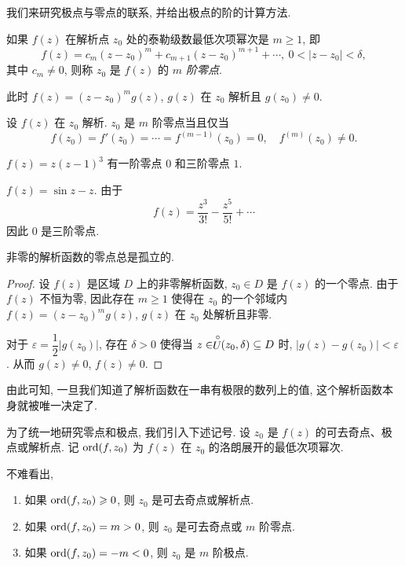 我们来研究极点与零点的联系, 并给出极点的阶的计算方法.
\begin{definition}\label{def:zero-order}
	如果 $f(z)$ 在解析点 $z_0$ 处的泰勒级数最低次项幂次是 $m\ge1$, 即
	\[f(z)=c_m(z-z_0)^m+c_{m+1}(z-z_0)^{m+1}+\cdots,\ 0<|z-z_0|<\delta,\]
	其中 $c_m\neq 0$, 则称 $z_0$ 是 $f(z)$ 的 \emph{$m$ 阶零点}.
\end{definition}

此时 $f(z)=(z-z_0)^mg(z)$, $g(z)$ 在 $z_0$ 解析且 $g(z_0)\neq 0$.

\begin{theorem}
	设 $f(z)$ 在 $z_0$ 解析.
	$z_0$ 是 $m$ 阶零点当且仅当
	\[f(z_0)=f'(z_0)=\cdots=f^{(m-1)}(z_0)=0,\quad
	f^{(m)}(z_0)\neq 0.\]
\end{theorem}

\begin{example}
		$f(z)=z(z-1)^3$
	{有一阶零点 $0$ 和三阶零点 $1$.
	}
\end{example}

\begin{example}
		$f(z)=\sin z-z$.
	{由于
		\[f(z)=\frac{z^3}{3!}-\frac{z^5}{5!}+\cdots\]
		因此 $0$ 是三阶零点.
	}
\end{example}

\begin{theorem}\label{thm:zero-isolated}
非零的解析函数的零点总是孤立的.
\end{theorem}

\begin{proof}
	设 $f(z)$ 是区域 $D$ 上的非零解析函数, $z_0\in D$ 是 $f(z)$ 的一个零点.
	由于 $f(z)$ 不恒为零, 因此存在 $m\ge 1$ 使得在 $z_0$ 的一个邻域内 $f(z)=(z-z_0)^m g(z)$, $g(z)$ 在 $z_0$ 处解析且非零.
	
	对于 $\varepsilon=\dfrac12|g(z_0)|$, 存在 $\delta>0$ 使得当 $z\in \stackrel{\circ}{U}\!\!(z_0,\delta)\subseteq D$ 时, $|g(z)-g(z_0)|<\varepsilon$.
	从而 $g(z)\neq0$, $f(z)\neq 0$.
\end{proof}

由此可知, 一旦我们知道了解析函数在一串有极限的数列上的值, 这个解析函数本身就被唯一决定了.

为了统一地研究零点和极点, 我们引入下述记号.
设 $z_0$ 是 $f(z)$ 的可去奇点、极点或解析点.
记 ${\mathrm{ord}}(f,z_0)$ 为 $f(z)$ 在 $z_0$ 的洛朗展开的最低次项幂次.

不难看出,
\begin{enumerate}
	\item 如果 ${\mathrm{ord}}(f,z_0)\geqslant0$, 则 $z_0$ 是可去奇点或解析点.
	\item 如果 ${\mathrm{ord}}(f,z_0)=m>0$, 则 $z_0$ 是可去奇点或 $m$ 阶零点.
	\item 如果 ${\mathrm{ord}}(f,z_0)=-m<0$, 则 $z_0$ 是 $m$ 阶极点.
\end{enumerate}

